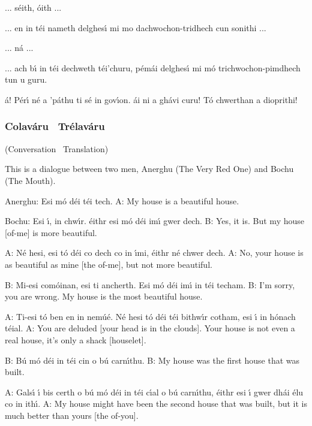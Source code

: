 \begin{leftbubbles}... s\'{e}ith, \'{o}ith ...\end{leftbubbles}
\begin{rightbubbles}... en in t\'{e}i nameth delghes\'{\i} mi mo dachwochon-tridhech cun sonithi ...\end{rightbubbles}
\begin{leftbubbles}... n\'{a} ...\end{leftbubbles}
\begin{rightbubbles}... ach b\'{\i} in t\'{e}i dechweth t\'{e}i'churu, p\'{e}m\'{a}i delghes\'{\i} mi m\'{o} trichwochon-pimdhech tun u guru.\end{rightbubbles}
\begin{leftbubbles}\'{a}! P\'{e}r\'{\i} n\'{e} a 'p\'{a}thu ti s\'{e} in gov\'{\i}on. \'{a}i ni a gh\'{a}vi curu! T\'{o} chwerthan a dioprithi!\end{leftbubbles}
\endgroup

\newpage
\subsubsection{Colav\'{a}ru \textendash\ Tr\'{e}lav\'{a}ru}
(Conversation \textendash\ Translation)

This is a dialogue between two men, Anerghu (The Very Red One) and Bochu (The Mouth).

Anerghu: Esi m\'{o} d\'{e}i t\'{e}i tech.
A: My house is a beautiful house.

Bochu: Esi \'{\i}, in chw\'{\i}r. \'{e}ithr esi m\'{o} d\'{e}i im\'{\i} gwer dech.
B: Yes, it is. But my house [of-me] is more beautiful.

A: N\'{e} hesi, esi t\'{o} d\'{e}i co dech co in \'{\i}mi, \'{e}ithr n\'{e} chwer dech.
A: No, your house is as beautiful as mine [the of-me], but not more beautiful.

B: Mi-esi com\'{o}inan, esi ti ancherth. Esi m\'{o} d\'{e}i im\'{\i} in t\'{e}i techam.
B: I'm sorry, you are wrong. My house is the most beautiful house.

A: Ti-esi t\'{o} ben en in nem\'{u}\'{e}. N\'{e} hesi t\'{o} d\'{e}i t\'{e}i bithw\'{\i}r cotham, esi \'{\i} in h\'{o}nach t\'{e}ial.
A: You are deluded [your head is in the clouds]. Your house is not even a real house, it's only a shack [houselet].

B: B\'{u} m\'{o} d\'{e}i in t\'{e}i cin o b\'{u} carn\'{\i}thu.
B: My house was the first house that was built.

A: Gals\'{\i} \'{\i} bis certh o b\'{u} m\'{o} d\'{e}i in t\'{e}i c\'{\i}al o b\'{u} carn\'{\i}thu, \'{e}ithr esi \'{\i} gwer dh\'{a}i \'{e}lu co in ith\'{\i}.
A: My house might have been the second house that was built, but it is much better than yours [the of-you].


